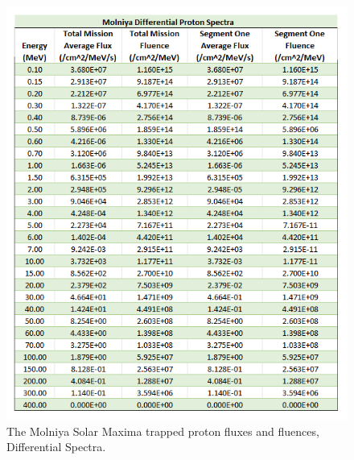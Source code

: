 \documentclass[11pt]{article}
\begin{document}
\begin{figure}[!b]
\begin{minipage}{\dimexpr.5\textwidth-1em}
        \includegraphics[width=1\linewidth]{Molinya_DPS.png}
        \caption{The Molniya Solar Maxima trapped proton fluxes and fluences, Differential Spectra.}
        \label{fig:MolniyaDPS}
    \end{minipage}
\end{figure}
\end{document}
